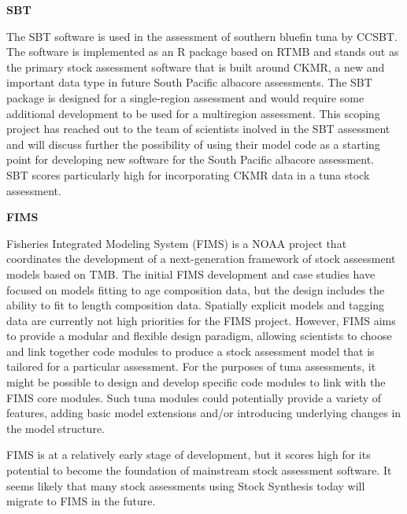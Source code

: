 \documentclass{SCreport}
\begin{document}
\vspace{1ex}

\textbf{SBT}

\vspace{-1ex}

The SBT software is used in the assessment of southern bluefin tuna by CCSBT.
The software is implemented as an R package based on RTMB and stands out as the
primary stock assessment software that is built around CKMR, a new and important
data type in future South Pacific albacore assessments. The SBT package is
designed for a single-region assessment and would require some additional
development to be used for a multiregion assessment. This scoping project has
reached out to the team of scientists inolved in the SBT assessment and will
discuss further the possibility of using their model code as a starting point
for developing new software for the South Pacific albacore assessment.\\[-4.5ex]

SBT scores particularly high for incorporating CKMR data in a tuna stock
assessment.

\vspace{1ex}

\textbf{FIMS}

\vspace{-1ex}

Fisheries Integrated Modeling System (FIMS) is a NOAA project that coordinates
the development of a next-generation framework of stock assessment models based
on TMB. The initial FIMS development and case studies have focused on models
fitting to age composition data, but the design includes the ability to fit to
length composition data. Spatially explicit models and tagging data are
currently not high priorities for the FIMS project. However, FIMS aims to
provide a modular and flexible design paradigm, allowing scientists to choose
and link together code modules to produce a stock assessment model that is
tailored for a particular assessment. For the purposes of tuna assessments, it
might be possible to design and develop specific code modules to link with the
FIMS core modules. Such tuna modules could potentially provide a variety of
features, adding basic model extensions and/or introducing underlying changes in
the model structure.

FIMS is at a relatively early stage of development, but it scores high for its
potential to become the foundation of mainstream stock assessment software. It
seems likely that many stock assessments using Stock Synthesis today will
migrate to FIMS in the future.
\end{document}
